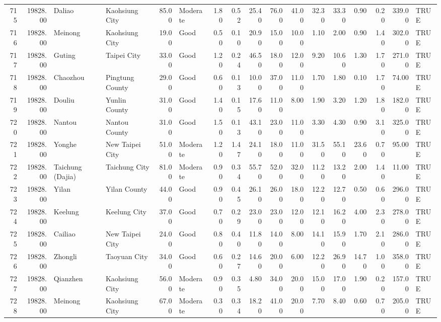 \begin{table}[ht]
\begin{tabular}{rrllrlrrrrrrrrrrl}
  715 & 19828.00 & Daliao & Kaohsiung City & 85.00 & Moderate & 1.80 & 0.52 & 25.40 & 76.00 & 41.00 & 32.30 & 33.30 & 0.90 & 0.20 & 339.00 & TRUE \\ 
  716 & 19828.00 & Meinong & Kaohsiung City & 19.00 & Good & 0.50 & 0.10 & 20.90 & 15.00 & 10.00 & 1.10 & 2.00 & 0.90 & 1.40 & 302.00 & TRUE \\ 
  717 & 19828.00 & Guting & Taipei City & 33.00 & Good & 1.20 & 0.24 & 46.50 & 18.00 & 12.00 & 9.20 & 10.60 & 1.30 & 1.70 & 271.00 & TRUE \\ 
  718 & 19828.00 & Chaozhou & Pingtung County & 29.00 & Good & 0.60 & 0.13 & 10.00 & 37.00 & 11.00 & 1.70 & 1.80 & 0.10 & 1.70 & 74.00 & TRUE \\ 
  719 & 19828.00 & Douliu & Yunlin County & 31.00 & Good & 1.40 & 0.15 & 17.60 & 11.00 & 8.00 & 1.90 & 3.20 & 1.20 & 1.80 & 182.00 & TRUE \\ 
  720 & 19828.00 & Nantou & Nantou County & 31.00 & Good & 1.50 & 0.13 & 43.10 & 23.00 & 11.00 & 3.30 & 4.30 & 0.90 & 3.10 & 325.00 & TRUE \\ 
  721 & 19828.00 & Yonghe & New Taipei City & 51.00 & Moderate & 1.20 & 1.47 & 24.10 & 18.00 & 11.00 & 31.50 & 55.10 & 23.60 & 0.70 & 95.00 & TRUE \\ 
  722 & 19828.00 & Taichung (Dajia) & Taichung City & 81.00 & Moderate & 0.90 & 0.34 & 55.70 & 52.00 & 32.00 & 11.20 & 13.20 & 2.00 & 1.40 & 11.00 & TRUE \\ 
  723 & 19828.00 & Yilan & Yilan County & 44.00 & Good & 0.90 & 0.45 & 26.10 & 26.00 & 18.00 & 12.20 & 12.70 & 0.50 & 0.60 & 296.00 & TRUE \\ 
  724 & 19828.00 & Keelung & Keelung City & 37.00 & Good & 0.70 & 0.29 & 23.00 & 23.00 & 12.00 & 12.10 & 16.20 & 4.00 & 2.30 & 278.00 & TRUE \\ 
  725 & 19828.00 & Cailiao & New Taipei City & 24.00 & Good & 0.80 & 0.40 & 11.80 & 14.00 & 8.00 & 14.10 & 15.90 & 1.70 & 2.10 & 286.00 & TRUE \\ 
  726 & 19828.00 & Zhongli & Taoyuan City & 34.00 & Good & 0.60 & 0.27 & 14.60 & 20.00 & 6.00 & 12.20 & 26.90 & 14.70 & 1.00 & 358.00 & TRUE \\ 
  727 & 19828.00 & Qianzhen & Kaohsiung City & 56.00 & Moderate & 0.90 & 0.35 & 4.80 & 34.00 & 20.00 & 15.00 & 17.00 & 1.90 & 0.20 & 157.00 & TRUE \\ 
  728 & 19828.00 & Meinong & Kaohsiung City & 67.00 & Moderate & 0.30 & 0.34 & 18.20 & 41.00 & 20.00 & 7.70 & 8.40 & 0.60 & 0.70 & 205.00 & TRUE \\ 

\end{tabular}
\end{table}
